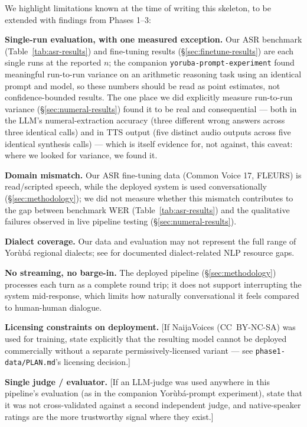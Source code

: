 We highlight limitations known at the time of writing this skeleton, to be
extended with findings from Phases 1--3:

\textbf{Single-run evaluation, with one measured exception.} Our ASR
benchmark (Table~\ref{tab:asr-results}) and fine-tuning results
(\S\ref{sec:finetune-results}) are each single runs at the reported $n$;
the companion \texttt{yoruba-prompt-experiment} found meaningful
run-to-run variance on an arithmetic reasoning task using an identical
prompt and model, so these numbers should be read as point estimates, not
confidence-bounded results. The one place we did explicitly measure
run-to-run variance (\S\ref{sec:numeral-results}) found it to be real and
consequential --- both in the LLM's numeral-extraction accuracy (three
different wrong answers across three identical calls) and in TTS output
(five distinct audio outputs across five identical synthesis calls) ---
which is itself evidence for, not against, this caveat: where we looked
for variance, we found it.

\textbf{Domain mismatch.} Our ASR fine-tuning data (Common Voice 17,
FLEURS) is read/scripted speech, while the deployed system is used
conversationally (\S\ref{sec:methodology}); we did not measure whether
this mismatch contributes to the gap between benchmark WER
(Table~\ref{tab:asr-results}) and the qualitative failures observed in
live pipeline testing (\S\ref{sec:numeral-results}).

\textbf{Dialect coverage.} Our data and evaluation may not represent the
full range of Yor\`ub\'a regional dialects; see \citet{voices-unheard-yoruba}
for documented dialect-related NLP resource gaps.

\textbf{No streaming, no barge-in.} The deployed pipeline
(\S\ref{sec:methodology}) processes each turn as a complete round trip;
it does not support interrupting the system mid-response, which limits how
naturally conversational it feels compared to human-human dialogue.

\textbf{Licensing constraints on deployment.} [If NaijaVoices (CC~BY-NC-SA)
was used for training, state explicitly that the resulting model cannot be
deployed commercially without a separate permissively-licensed variant —
see \texttt{phase1-data/PLAN.md}'s licensing decision.]

\textbf{Single judge / evaluator.} [If an LLM-judge was used anywhere in
this pipeline's evaluation (as in the companion Yor\`ub\'a-prompt
experiment), state that it was not cross-validated against a second
independent judge, and native-speaker ratings are the more trustworthy
signal where they exist.]

